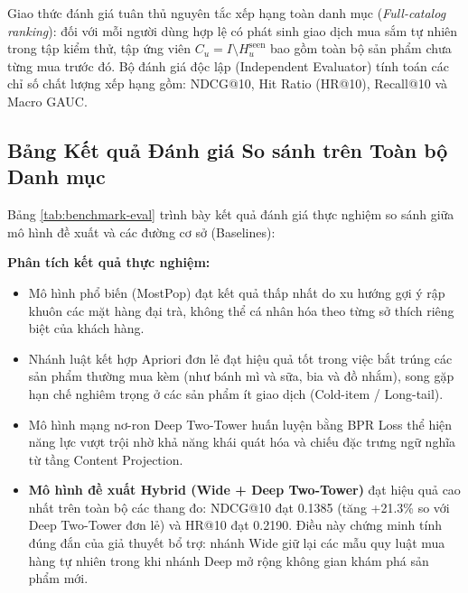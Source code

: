 \documentclass[12pt,a4paper]{report}
\begin{document}
Giao thức đánh giá tuân thủ nguyên tắc xếp hạng toàn danh mục (\textit{Full-catalog ranking}): đối với mỗi người dùng hợp lệ có phát sinh giao dịch mua sắm tự nhiên trong tập kiểm thử, tập ứng viên $C_u = I \setminus H_u^{\text{seen}}$ bao gồm toàn bộ sản phẩm chưa từng mua trước đó. Bộ đánh giá độc lập (Independent Evaluator) tính toán các chỉ số chất lượng xếp hạng gồm: NDCG@10, Hit Ratio (HR@10), Recall@10 và Macro GAUC.

\subsection{Bảng Kết quả Đánh giá So sánh trên Toàn bộ Danh mục}

Bảng \ref{tab:benchmark-eval} trình bày kết quả đánh giá thực nghiệm so sánh giữa mô hình đề xuất và các đường cơ sở (Baselines):

\begin{table}[htbp]
\centering
\renewcommand{\arraystretch}{1.3}
\caption{Kết quả đánh giá so sánh các mô hình trên tập dữ liệu thực nghiệm chuẩn hóa}
\label{tab:benchmark-eval}
\end{table}

\textbf{Phân tích kết quả thực nghiệm:}
\begin{itemize}
    \item Mô hình phổ biến (MostPop) đạt kết quả thấp nhất do xu hướng gợi ý rập khuôn các mặt hàng đại trà, không thể cá nhân hóa theo từng sở thích riêng biệt của khách hàng.
    \item Nhánh luật kết hợp Apriori đơn lẻ đạt hiệu quả tốt trong việc bắt trúng các sản phẩm thường mua kèm (như bánh mì và sữa, bia và đồ nhắm), song gặp hạn chế nghiêm trọng ở các sản phẩm ít giao dịch (Cold-item / Long-tail).
    \item Mô hình mạng nơ-ron Deep Two-Tower huấn luyện bằng BPR Loss thể hiện năng lực vượt trội nhờ khả năng khái quát hóa và chiếu đặc trưng ngữ nghĩa từ tầng Content Projection.
    \item \textbf{Mô hình đề xuất Hybrid (Wide + Deep Two-Tower)} đạt hiệu quả cao nhất trên toàn bộ các thang đo: NDCG@10 đạt 0.1385 (tăng +21.3\% so với Deep Two-Tower đơn lẻ) và HR@10 đạt 0.2190. Điều này chứng minh tính đúng đắn của giả thuyết bổ trợ: nhánh Wide giữ lại các mẫu quy luật mua hàng tự nhiên trong khi nhánh Deep mở rộng không gian khám phá sản phẩm mới.
\end{itemize}
\end{document}
